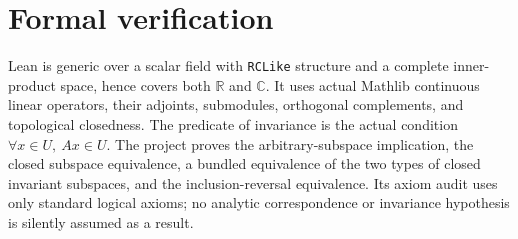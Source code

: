\documentclass[10pt,a4paper]{article}
\begin{document}
\section*{Formal verification}
Lean is generic over a scalar field with \texttt{RCLike} structure
and a complete inner-product space, hence covers both $\mathbb R$
and $\mathbb C$. It uses actual Mathlib continuous linear operators,
their adjoints, submodules, orthogonal complements, and topological
closedness. The predicate of invariance is the actual condition
$\forall x\in U,\ Ax\in U$.
The project proves the arbitrary-subspace implication, the closed
subspace equivalence, a bundled equivalence of the two types of closed
invariant subspaces, and the inclusion-reversal equivalence.
Its axiom audit uses only standard logical axioms; no analytic
correspondence or invariance hypothesis is silently assumed as a result.
\end{document}
